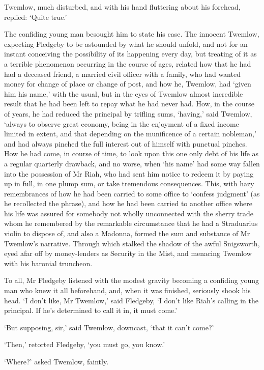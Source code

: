 Twemlow, much disturbed, and with his hand fluttering about his
forehead, replied: ‘Quite true.’

The confiding young man besought him to state his case. The innocent
Twemlow, expecting Fledgeby to be astounded by what he should unfold,
and not for an instant conceiving the possibility of its happening every
day, but treating of it as a terrible phenomenon occurring in the course
of ages, related how that he had had a deceased friend, a married civil
officer with a family, who had wanted money for change of place or
change of post, and how he, Twemlow, had ‘given him his name,’ with the
usual, but in the eyes of Twemlow almost incredible result that he had
been left to repay what he had never had. How, in the course of years,
he had reduced the principal by trifling sums, ‘having,’ said Twemlow,
‘always to observe great economy, being in the enjoyment of a fixed
income limited in extent, and that depending on the munificence of
a certain nobleman,’ and had always pinched the full interest out of
himself with punctual pinches. How he had come, in course of time,
to look upon this one only debt of his life as a regular quarterly
drawback, and no worse, when ‘his name’ had some way fallen into the
possession of Mr Riah, who had sent him notice to redeem it by paying up
in full, in one plump sum, or take tremendous consequences. This, with
hazy remembrances of how he had been carried to some office to ‘confess
judgment’ (as he recollected the phrase), and how he had been carried
to another office where his life was assured for somebody not wholly
unconnected with the sherry trade whom he remembered by the remarkable
circumstance that he had a Straduarius violin to dispose of, and also a
Madonna, formed the sum and substance of Mr Twemlow’s narrative. Through
which stalked the shadow of the awful Snigsworth, eyed afar off by
money-lenders as Security in the Mist, and menacing Twemlow with his
baronial truncheon.

To all, Mr Fledgeby listened with the modest gravity becoming a
confiding young man who knew it all beforehand, and, when it was
finished, seriously shook his head. ‘I don’t like, Mr Twemlow,’ said
Fledgeby, ‘I don’t like Riah’s calling in the principal. If he’s
determined to call it in, it must come.’

‘But supposing, sir,’ said Twemlow, downcast, ‘that it can’t come?’

‘Then,’ retorted Fledgeby, ‘you must go, you know.’

‘Where?’ asked Twemlow, faintly.

